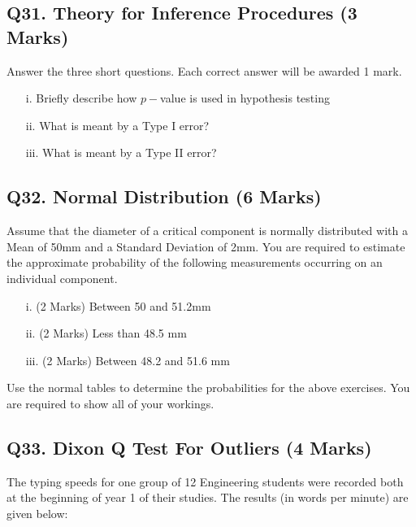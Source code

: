 \documentclass[a4paper,12pt]{article}
\begin{document}
\subsection*{Q31. Theory for Inference Procedures (3 Marks)}
Answer the three short questions. Each correct answer will be awarded 1 mark.
\begin{itemize}
	\item[i.] Briefly describe how $p-$value is used in hypothesis testing
	\item[ii.] What is meant by a Type I error?
	\item[iii.] What is meant by a Type II error?
\end{itemize}
%

\subsection*{Q32. Normal Distribution (6 Marks)} %
Assume that the diameter of a critical component is normally distributed with a Mean of 50mm and a Standard Deviation of 2mm. You are required  to estimate the approximate probability of the following measurements occurring on an individual component.
\begin{itemize}
	\item [i.](2 Marks)	Between 50 and 51.2mm
	\item [ii.](2 Marks) Less than 48.5 mm
	\item [iii.](2 Marks) Between 48.2 and 51.6 mm
\end{itemize}

\noindent Use the normal tables to determine the probabilities for the above exercises. You are required to show all of your workings.

\subsection*{Q33. Dixon Q Test For Outliers (4 Marks)}

The typing speeds for one group of 12 Engineering students were recorded both at the beginning of year 1 of their studies. The results (in words per minute) are given below:
\end{document}
